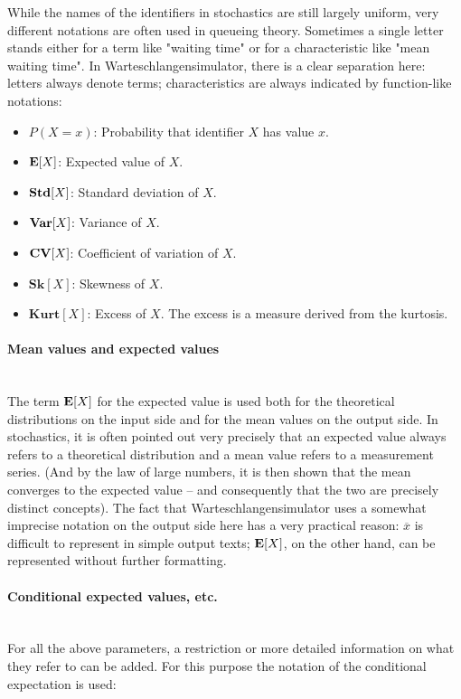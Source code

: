 \documentclass{svmono}
\begin{document}
While the names of the identifiers in stochastics are still largely uniform, very different notations are often used in queueing theory. Sometimes a single letter stands either for a term like "waiting time" or for a characteristic like "mean waiting time". In Warteschlangensimulator, there is a clear separation here: letters always denote terms; characteristics are always indicated by function-like notations:

\begin{itemize}
\item
$P(X=x)$:
Probability that identifier $X$ has value $x$.
\item
${\bf E}[X]$:
Expected value of $X$.
\item
${\bf Std}[X]$:
Standard deviation of $X$.
\item
${\bf Var}[X]$:
Variance of $X$.
\item
${\bf CV}[X]$:
Coefficient of variation of $X$.
\item
$\mathbf{Sk}[X]$:
Skewness of $X$.
\item
$\mathbf{Kurt}[X]$:
Excess of $X$. The excess is a measure derived from the kurtosis.
\end{itemize}

\paragraph{Mean values and expected values}~\\
The term ${\bf E}[X]$ for the expected value is used both for the theoretical distributions on the input side and for the mean values on the output side. In stochastics, it is often pointed out very precisely that an expected value always refers to a theoretical distribution and a mean value refers to a measurement series. (And by the law of large numbers, it is then shown that the mean converges to the expected value -- and consequently that the two are precisely distinct concepts). The fact that Warteschlangensimulator uses a somewhat imprecise notation on the output side here has a very practical reason: $\overline{x}$ is difficult to represent in simple output texts; ${\bf E}[X]$, on the other hand, can be represented without further formatting.

\paragraph{Conditional expected values, etc.}~\\
For all the above parameters, a restriction or more detailed information on what they refer to can be added. For this purpose the notation of the conditional expectation is used:
\end{document}
